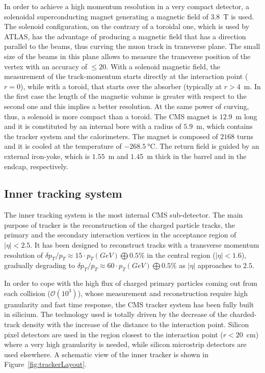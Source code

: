 In order to achieve a high momentum resolution in a very compact detector,
a solenoidal superconducting magnet generating a magnetic field of 3.8~\si{\tesla} is used. 
The solenoid configuration, on the contrary of a toroidal one, which is used by ATLAS,
has the advantage of producing a magnetic field that has a direction 
parallel to the beams, thus curving the muon track in transverse plane. 
The small size of the beams in this plane allows to measure the transverse 
position of the vertex with an accuracy of $\le20$\si{\mum}. 
With a solenoid magnetic field, the measurement of the track-momentum starts directly 
at the interaction point ($r=0$), while with a toroid, that starts over the absorber (typically at $r>4$~\si{\metre}.
In the first case the length of the magnetic volume is greater with respect
to the second one and this implies a better resolution. 
At the same power of curving, thus, a solenoid is more compact than a toroid.
The CMS magnet is $12.9$~\si{\metre} long and it is constituted by an internal bore
with a radius of $5.9$~\si{\metre}, which contains the tracker system and
the calorimeters. The magnet is composed of $2168$ turns and it is cooled
at the temperature of $-268.5~\si{\degreeCelsius}$. The return field is guided
by an external iron-yoke, which is $1.55$~\si{\metre} and $1.45$~\si{\metre} thick
in the barrel and in the endcap, respectively.

\subsection{Inner tracking system}
\label{subsec:tracker}

The inner tracking system is the most internal CMS sub-detector.
The main purpose of tracker is the reconstruction of 
the charged particle tracks, the primary and the secondary interaction vertices 
in the acceptance region of $|\eta|<2.5$. 
It has been designed to reconstruct tracks with a transverse momentum resolution
of $\delta p_T/p_T \approx 15\cdot p_T(GeV)\bigoplus 0.5\%$ in the central region
($|\eta|<1.6$), gradually degrading to $\delta p_T/p_T \approx 60\cdot p_T(GeV)\bigoplus 0.5\%$ 
as $|\eta|$ approaches to $2.5$. 


In order to cope with the high flux of charged primary particles coming out from each collision
($\mathcal{O}(10^3)$), whose measurement and reconstruction require high granularity and
fast time response, the CMS tracker system has been fully built in silicium.
The technology used is totally driven by the decrease of the charded-track density 
with the increase of the distance to the interaction point. Silicon pixel detectors are used 
in the region closest to the interaction point ($r<20$~\si{cm})
where a very high granularity is needed, while silicon microstrip detectors are used elsewhere.
A schematic view of the inner tracker is shown in Figure~\ref{fig:trackerLayout}.

